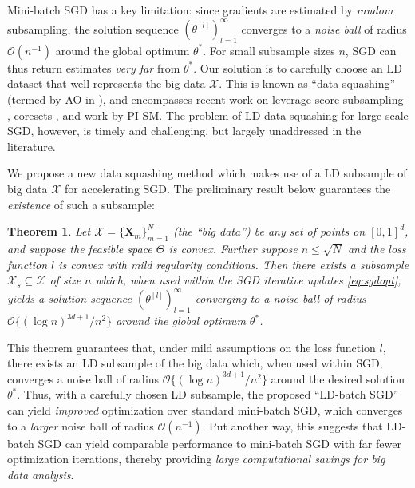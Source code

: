 \documentclass[11pt]{NSFamsart}
\newcommand{\SM}{\hyperlink{SMlink}{SM}\xspace}
\newcommand{\AO}{\hyperlink{AOlink}{AO}\xspace}
\newtheorem{theorem}{Theorem}
\newcommand{\bX}{{\boldsymbol{X}}}
\begin{document}
Mini-batch SGD has a key limitation: since gradients are estimated by \textit{random} subsampling, the solution sequence $(\theta^{[l]})_{l=1}^\infty$ converges to a \textit{noise ball} of radius $\mathcal{O}(n^{-1})$ around the global optimum $\theta^*$. For small subsample sizes $n$, SGD can thus return estimates
\textit{very far} from  $\theta^*$. Our solution is to carefully choose an LD dataset that well-represents the big data $\mathcal{X}$. This is known as ``data squashing'' (termed by \AO in \cite{owen2003data}), and encompasses recent work on leverage-score subsampling \cite{ma2015statistical}, coresets \cite{chan2006faster,bachem2017practical, huggins2016coresets}, and work by PI \SM \cite{mak2018support,mak2018minimax,mak2017projected,krishna2019distributional}. The problem of LD data squashing for large-scale SGD, however, is timely and challenging, but largely unaddressed in the literature.

We propose a new data squashing method which makes use of a LD subsample of big data $\mathcal{X}$ for accelerating SGD. The preliminary result below guarantees the \textit{existence} of such a subsample:
\begin{theorem}
Let $\mathcal{X} = \{\bX_m\}_{m=1}^N$ (the ``big data'') be any set of points on $[0,1]^d$, and suppose the feasible space $\Theta$ is convex. Further suppose $n \leq \sqrt{N}$ and the loss function $l$ is convex with mild regularity conditions. Then there exists a subsample $\mathcal{X}_s \subseteq \mathcal{X}$ of size $n$ which, when used within the SGD iterative updates \eqref{eq:sgdopt}, yields a solution sequence $(\theta^{[l]})_{l=1}^\infty$ converging to a noise ball of radius $\mathcal{O}\{(\log n)^{3d+1}/n^2\}$ around the global optimum $\theta^*$.
\label{thm:ldsgd}
\end{theorem}
\noindent This theorem guarantees that, under mild assumptions on the loss function $l$, there exists an LD subsample of the big data which, when used within SGD, converges a noise ball of radius $\mathcal{O}\{(\log n)^{3d+1}/n^2\}$ around the desired solution $\theta^*$. Thus, with a carefully chosen LD subsample, the proposed ``LD-batch SGD'' can yield \textit{improved} optimization over standard mini-batch SGD, which converges to a \textit{larger} noise ball of radius $\mathcal{O}(n^{-1})$. Put another way, this suggests that LD-batch SGD can yield comparable performance to mini-batch SGD with far fewer optimization iterations, thereby providing \textit{large computational savings for big data analysis}.
\end{document}
